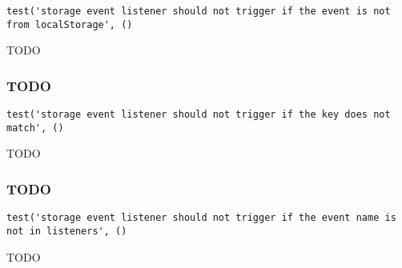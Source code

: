 \documentclass[a4paper]{article}
\begin{document}
\begin{lstlisting}
test('storage event listener should not trigger if the event is not from localStorage', ()
\end{lstlisting}

TODO

\hypertarget{toc740}{}
\subsubsection{TODO}

\begin{lstlisting}
test('storage event listener should not trigger if the key does not match', ()
\end{lstlisting}

TODO

\hypertarget{toc741}{}
\subsubsection{TODO}

\begin{lstlisting}
test('storage event listener should not trigger if the event name is not in listeners', ()
\end{lstlisting}

TODO

\end{document}
